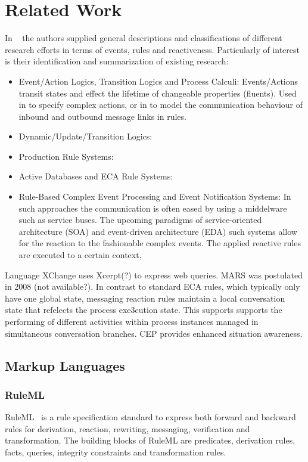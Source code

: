 \documentclass[11pt]{article}%
\begin{document}
\section{Related Work}
In ~\cite{2009-Paschke_Boley-RCER.pdf} the authors supplied general descriptions and classifications of different research efforts in terms of events, rules and reactiveness. Particularly of interest is their identification and summarization of existing research:
 \begin{itemize}
  \item Event/Action Logics, Transition Logics and Process Calculi: Events/Actions transit states and effect the lifetime of changeable properties (fluents). Used in \cite{Behrends:2008:EEA:1377798.1377801} to specify complex actions, or in to model the communication behaviour of inbound and outbound message links in rules.
  \item Dynamic/Update/Transition Logics: 
  \item Production Rule Systems:
  \item Active Databases and ECA Rule Systems:
  \item Rule-Based Complex Event Processing and Event Notification Systems: In such approaches the communication is often eased by using a middelware such as service buses. The upcoming paradigms of service-oriented architecture (SOA) and event-driven architecture (EDA) such systems allow for the reaction to the fashionable complex events. The applied reactive rules are executed to a certain context,

\end{itemize}
Language XChange uses Xcerpt(?) to express web queries. MARS was postulated in 2008 (not available?).
In contrast to standard ECA rules, which typically only have one global state, messaging reaction rules maintain a local conversation state that refelects the process exe3cution state. This supports supports the performing of different activities within process instances managed in simultaneous conversation branches.
CEP  provides enhanced situation awareness.

\subsection{Markup Languages}


\subsubsection{RuleML}
RuleML~\cite{2006-Boley-RuleML.pdf} is a rule specification standard to express both forward and backward rules for derivation, reaction, rewriting, messaging, verification and transformation. The building blocks of RuleML are predicates, derivation rules, facts, queries, integrity constraints and transformation rules.
\end{document}

